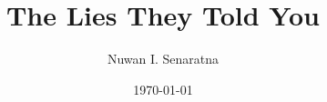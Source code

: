 \documentclass[12pt,openany]{book}
\begin{document}
\frontmatter
\title{The Lies They Told You}
\author{Nuwan I. Senaratna}
\date{\today}

\maketitle

\tableofcontents
\clearpage  

\mainmatter{}
\setcounter{chapter}{1}
\end{document}
